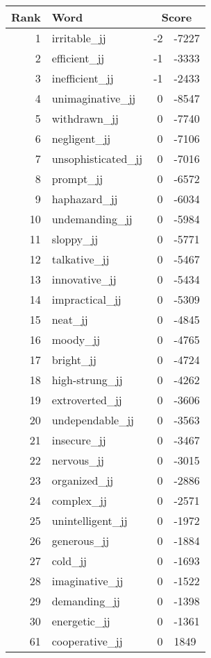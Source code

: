 \begin{longtable}[!htbp]{| rlr@{.}l |}
    \hline
    \textbf{Rank} & \textbf{Word} & \multicolumn{2}{c|}{\textbf{Score}} \\
    \hline
    \endhead
    1 & irritable\_jj & -2 & -7227 \\
    2 & efficient\_jj & -1 & -3333 \\
    3 & inefficient\_jj & -1 & -2433 \\
    4 & unimaginative\_jj & 0 & -8547 \\
    5 & withdrawn\_jj & 0 & -7740 \\
    6 & negligent\_jj & 0 & -7106 \\
    7 & unsophisticated\_jj & 0 & -7016 \\
    8 & prompt\_jj & 0 & -6572 \\
    9 & haphazard\_jj & 0 & -6034 \\
    10 & undemanding\_jj & 0 & -5984 \\
    11 & sloppy\_jj & 0 & -5771 \\
    12 & talkative\_jj & 0 & -5467 \\
    13 & innovative\_jj & 0 & -5434 \\
    14 & impractical\_jj & 0 & -5309 \\
    15 & neat\_jj & 0 & -4845 \\
    16 & moody\_jj & 0 & -4765 \\
    17 & bright\_jj & 0 & -4724 \\
    18 & high-strung\_jj & 0 & -4262 \\
    19 & extroverted\_jj & 0 & -3606 \\
    20 & undependable\_jj & 0 & -3563 \\
    21 & insecure\_jj & 0 & -3467 \\
    22 & nervous\_jj & 0 & -3015 \\
    23 & organized\_jj & 0 & -2886 \\
    24 & complex\_jj & 0 & -2571 \\
    25 & unintelligent\_jj & 0 & -1972 \\
    26 & generous\_jj & 0 & -1884 \\
    27 & cold\_jj & 0 & -1693 \\
    28 & imaginative\_jj & 0 & -1522 \\
    29 & demanding\_jj & 0 & -1398 \\
    30 & energetic\_jj & 0 & -1361 \\
    61 & cooperative\_jj & 0 & 1849 \\

\end{longtable}
